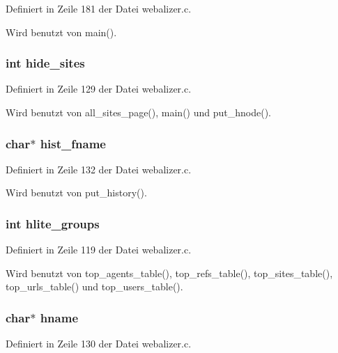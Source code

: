 Definiert in Zeile 181 der Datei webalizer.c.

Wird benutzt von main().
\subsubsection{\setlength{\rightskip}{0pt plus 5cm}int {\bf hide\_\-sites}}\label{webalizer_8h_a77fbf13eba0ffbb98b893c0089cb49b}




Definiert in Zeile 129 der Datei webalizer.c.

Wird benutzt von all\_\-sites\_\-page(), main() und put\_\-hnode().
\subsubsection{\setlength{\rightskip}{0pt plus 5cm}char$\ast$ {\bf hist\_\-fname}}\label{webalizer_8h_196026e726faa9db510409f5d895d7a3}




Definiert in Zeile 132 der Datei webalizer.c.

Wird benutzt von put\_\-history().
\subsubsection{\setlength{\rightskip}{0pt plus 5cm}int {\bf hlite\_\-groups}}\label{webalizer_8h_607dff280556363fab771e9e492ea057}




Definiert in Zeile 119 der Datei webalizer.c.

Wird benutzt von top\_\-agents\_\-table(), top\_\-refs\_\-table(), top\_\-sites\_\-table(), top\_\-urls\_\-table() und top\_\-users\_\-table().
\subsubsection{\setlength{\rightskip}{0pt plus 5cm}char$\ast$ {\bf hname}}\label{webalizer_8h_674a1f0ec86ffb26578c11999c89a3c0}




Definiert in Zeile 130 der Datei webalizer.c.

